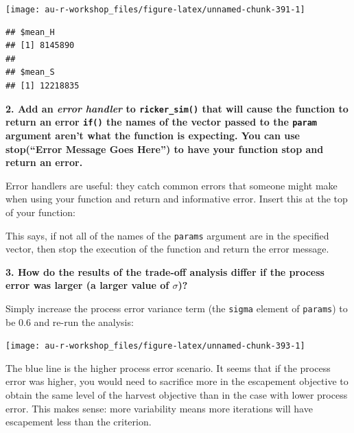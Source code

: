 \documentclass[]{book}
\newenvironment{Shaded}{\begin{snugshade}}{\end{snugshade}}
\newcommand{\KeywordTok}[1]{\textcolor[rgb]{0.13,0.29,0.53}{\textbf{#1}}}
\newcommand{\StringTok}[1]{\textcolor[rgb]{0.31,0.60,0.02}{#1}}
\newcommand{\ControlFlowTok}[1]{\textcolor[rgb]{0.13,0.29,0.53}{\textbf{#1}}}
\newcommand{\OperatorTok}[1]{\textcolor[rgb]{0.81,0.36,0.00}{\textbf{#1}}}
\newcommand{\NormalTok}[1]{#1}
\theoremstyle{definition}
\theoremstyle{definition}
\theoremstyle{definition}
\theoremstyle{remark}
\begin{document}
\begin{center}\texttt{[image: au-r-workshop\_files/figure-latex/unnamed-chunk-391-1]} \end{center}

\begin{verbatim}
## $mean_H
## [1] 8145890
## 
## $mean_S
## [1] 12218835
\end{verbatim}

\textbf{2. Add an \emph{error handler} to \texttt{ricker\_sim()} that
will cause the function to return an error \texttt{if()} the names of
the vector passed to the \texttt{param} argument aren't what the
function is expecting. You can use stop(``Error Message Goes Here'') to
have your function stop and return an error.}

Error handlers are useful: they catch common errors that someone might
make when using your function and return and informative error. Insert
this at the top of your function:

\begin{Shaded}
\end{Shaded}

This says, if not all of the names of the \texttt{params} argument are
in the specified vector, then stop the execution of the function and
return the error message.

\textbf{3. How do the results of the trade-off analysis differ if the
process error was larger (a larger value of \(\sigma\))?}

Simply increase the process error variance term (the \texttt{sigma}
element of \texttt{params}) to be 0.6 and re-run the analysis:

\begin{center}\texttt{[image: au-r-workshop\_files/figure-latex/unnamed-chunk-393-1]} \end{center}

The blue line is the higher process error scenario. It seems that if the
process error was higher, you would need to sacrifice more in the
escapement objective to obtain the same level of the harvest objective
than in the case with lower process error. This makes sense: more
variability means more iterations will have escapement less than the
criterion.
\end{document}
